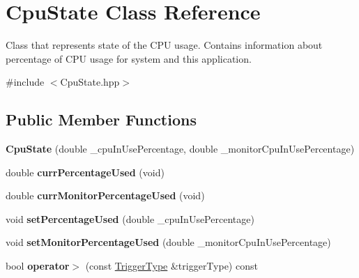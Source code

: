 \hypertarget{classCpuState}{}\section{Cpu\+State Class Reference}
\label{classCpuState}


Class that represents state of the C\+PU usage. Contains information about percentage of C\+PU usage for system and this application.  




{\ttfamily \#include $<$Cpu\+State.\+hpp$>$}

\subsection*{Public Member Functions}
\begin{DoxyCompactItemize}
\item 
{\bfseries Cpu\+State} (double \+\_\+cpu\+In\+Use\+Percentage, double \+\_\+monitor\+Cpu\+In\+Use\+Percentage)\hypertarget{classCpuState_a3b167aab35c977484af7a1288868538a}{}\label{classCpuState_a3b167aab35c977484af7a1288868538a}

\item 
double {\bfseries curr\+Percentage\+Used} (void)\hypertarget{classCpuState_a37925c37362e0857655eb02bea295af6}{}\label{classCpuState_a37925c37362e0857655eb02bea295af6}

\item 
double {\bfseries curr\+Monitor\+Percentage\+Used} (void)\hypertarget{classCpuState_a3b65b3dd5bb67181f0fa643ef9f3c25a}{}\label{classCpuState_a3b65b3dd5bb67181f0fa643ef9f3c25a}

\item 
void {\bfseries set\+Percentage\+Used} (double \+\_\+cpu\+In\+Use\+Percentage)\hypertarget{classCpuState_a6d3715f1b8f189af792b675a2dc7f0c7}{}\label{classCpuState_a6d3715f1b8f189af792b675a2dc7f0c7}

\item 
void {\bfseries set\+Monitor\+Percentage\+Used} (double \+\_\+monitor\+Cpu\+In\+Use\+Percentage)\hypertarget{classCpuState_a1c42ccd8a57dd00ef2b15f963c9fd57e}{}\label{classCpuState_a1c42ccd8a57dd00ef2b15f963c9fd57e}

\item 
bool {\bfseries operator$>$} (const \hyperlink{structTriggerType}{Trigger\+Type} \&trigger\+Type) const \hypertarget{classCpuState_ad916c435388bfa5588db267b374dea00}{}\label{classCpuState_ad916c435388bfa5588db267b374dea00}


\end{DoxyCompactItemize}
